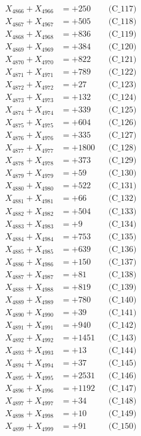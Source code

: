 \documentclass[a4paper,10pt]{article}
\begin{document}
{\begin{align}
X_{4866} + X_{4966} &= +250 && \text{(C\_117)} \\
X_{4867} + X_{4967} &= +505 && \text{(C\_118)} \\
X_{4868} + X_{4968} &= +836 && \text{(C\_119)} \\
X_{4869} + X_{4969} &= +384 && \text{(C\_120)} \\
\allowbreak
X_{4870} + X_{4970} &= +822 && \text{(C\_121)} \\
X_{4871} + X_{4971} &= +789 && \text{(C\_122)} \\
X_{4872} + X_{4972} &= +27 && \text{(C\_123)} \\
X_{4873} + X_{4973} &= +132 && \text{(C\_124)} \\
X_{4874} + X_{4974} &= +339 && \text{(C\_125)} \\
\allowbreak
X_{4875} + X_{4975} &= +604 && \text{(C\_126)} \\
X_{4876} + X_{4976} &= +335 && \text{(C\_127)} \\
X_{4877} + X_{4977} &= +1800 && \text{(C\_128)} \\
X_{4878} + X_{4978} &= +373 && \text{(C\_129)} \\
X_{4879} + X_{4979} &= +59 && \text{(C\_130)} \\
\allowbreak
X_{4880} + X_{4980} &= +522 && \text{(C\_131)} \\
X_{4881} + X_{4981} &= +66 && \text{(C\_132)} \\
X_{4882} + X_{4982} &= +504 && \text{(C\_133)} \\
X_{4883} + X_{4983} &= +9 && \text{(C\_134)} \\
X_{4884} + X_{4984} &= +753 && \text{(C\_135)} \\
\allowbreak
X_{4885} + X_{4985} &= +639 && \text{(C\_136)} \\
X_{4886} + X_{4986} &= +150 && \text{(C\_137)} \\
X_{4887} + X_{4987} &= +81 && \text{(C\_138)} \\
X_{4888} + X_{4988} &= +819 && \text{(C\_139)} \\
X_{4889} + X_{4989} &= +780 && \text{(C\_140)} \\
\allowbreak
X_{4890} + X_{4990} &= +39 && \text{(C\_141)} \\
X_{4891} + X_{4991} &= +940 && \text{(C\_142)} \\
X_{4892} + X_{4992} &= +1451 && \text{(C\_143)} \\
X_{4893} + X_{4993} &= +13 && \text{(C\_144)} \\
X_{4894} + X_{4994} &= +37 && \text{(C\_145)} \\
\allowbreak
X_{4895} + X_{4995} &= +2531 && \text{(C\_146)} \\
X_{4896} + X_{4996} &= +1192 && \text{(C\_147)} \\
X_{4897} + X_{4997} &= +34 && \text{(C\_148)} \\
X_{4898} + X_{4998} &= +10 && \text{(C\_149)} \\
X_{4899} + X_{4999} &= +91 && \text{(C\_150)} \\
\end{align}
}
\end{document}
